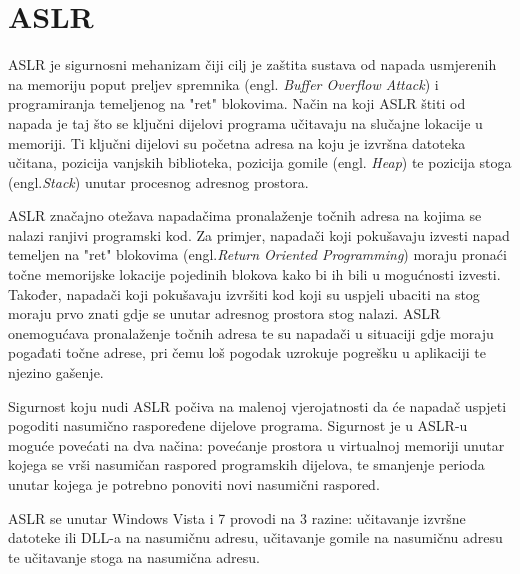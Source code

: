 \documentclass[times, utf8, diplomski, numeric]{fer}
\begin{document}
\section{ASLR}
\label{sct:aslr}
ASLR je sigurnosni mehanizam čiji cilj je zaštita sustava od napada usmjerenih na memoriju poput preljev spremnika (engl. \emph{Buffer Overflow Attack}) i programiranja temeljenog na "ret" blokovima. Način na koji ASLR štiti od napada je taj što se ključni dijelovi programa učitavaju na slučajne lokacije u memoriji. Ti ključni dijelovi su početna adresa na koju je izvršna datoteka učitana, pozicija vanjskih biblioteka, pozicija gomile (engl. \emph{Heap}) te pozicija stoga (engl.\emph{Stack}) unutar procesnog adresnog prostora.

ASLR značajno otežava napadačima pronalaženje točnih adresa na kojima se nalazi ranjivi programski kod. Za primjer, napadači koji pokušavaju izvesti napad temeljen na "ret" blokovima (engl.\emph{Return Oriented Programming})\citep{rop_official} moraju pronaći točne memorijske lokacije pojedinih blokova kako bi ih bili u mogućnosti izvesti. Također, napadači koji pokušavaju izvršiti kod koji su uspjeli ubaciti na stog moraju prvo znati gdje se unutar adresnog prostora stog nalazi. ASLR onemogućava pronalaženje točnih adresa te su napadači u situaciji gdje moraju pogađati točne adrese, pri čemu loš pogodak uzrokuje pogrešku u aplikaciji te njezino gašenje.

Sigurnost koju nudi ASLR počiva na malenoj vjerojatnosti da će napadač uspjeti pogoditi nasumično raspoređene dijelove programa. Sigurnost je u ASLR-u moguće povećati na dva načina: povećanje prostora u virtualnoj memoriji unutar kojega se vrši nasumičan raspored programskih dijelova, te smanjenje perioda unutar kojega je potrebno ponoviti novi nasumični raspored. 

ASLR se unutar Windows Vista i 7 provodi na 3 razine: učitavanje izvršne datoteke ili DLL-a na nasumičnu adresu, učitavanje gomile na nasumičnu adresu te učitavanje stoga na nasumična adresu. 
\end{document}
